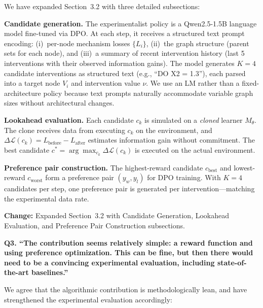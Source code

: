 \documentclass[11pt]{article}
\newcommand{\reviewer}[1]{\vspace{0.8em}\noindent\textbf{\textcolor{reviewercolor}{#1}}}
\newcommand{\response}{\vspace{0.3em}\noindent\textcolor{responsecolor}}
\newcommand{\change}[1]{\textcolor{changecolor}{\textbf{Change:} #1}}
\begin{document}
\response We have expanded Section~3.2 with three detailed subsections:

\textbf{Candidate generation.} The experimentalist policy is a Qwen2.5-1.5B language model fine-tuned via DPO. At each step, it receives a structured text prompt encoding: (i)~per-node mechanism losses $\{L_i\}$, (ii)~the graph structure (parent sets for each node), and (iii)~a summary of recent intervention history (last 5 interventions with their observed information gains). The model generates $K=4$ candidate interventions as structured text (e.g., ``DO X2 = 1.3''), each parsed into a target node $V_i$ and intervention value $\nu$. We use an LM rather than a fixed-architecture policy because text prompts naturally accommodate variable graph sizes without architectural changes.

\textbf{Lookahead evaluation.} Each candidate $c_k$ is simulated on a \emph{cloned} learner $M_\theta$. The clone receives data from executing $c_k$ on the environment, and $\Delta\mathcal{L}(c_k) = L_{\text{before}} - L_{\text{after}}$ estimates information gain without commitment. The best candidate $c^* = \arg\max_{c_k} \Delta\mathcal{L}(c_k)$ is executed on the actual environment.

\textbf{Preference pair construction.} The highest-reward candidate $c_{\text{best}}$ and lowest-reward $c_{\text{worst}}$ form a preference pair $(y_w, y_l)$ for DPO training. With $K=4$ candidates per step, one preference pair is generated per intervention---matching the experimental data rate.

\change{Expanded Section~3.2 with Candidate Generation, Lookahead Evaluation, and Preference Pair Construction subsections.}

\reviewer{Q3. ``The contribution seems relatively simple: a reward function and using preference optimization. This can be fine, but then there would need to be a convincing experimental evaluation, including state-of-the-art baselines.''}

\response We agree that the algorithmic contribution is methodologically lean, and have strengthened the experimental evaluation accordingly:
\end{document}
